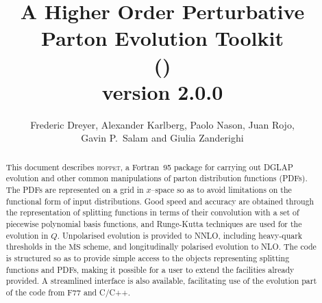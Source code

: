 \documentclass[12pt]{article}
\title{A Higher Order Perturbative Parton Evolution Toolkit \\
(\hoppet)\\

version 2.0.0
}
\author{%
  Frederic Dreyer,
  Alexander Karlberg,
  Paolo Nason,
  Juan Rojo,\\
  Gavin P.\ Salam and
  Giulia Zanderighi
}
\date{}
\newcommand{\MSbar}{\overline{\mathrm{MS}}}
\newcommand{\hoppet}{\textsc{hoppet}\xspace}
\begin{document}
\maketitle 

\begin{abstract}
  This document describes \hoppet, a Fortran~95 package for carrying out DGLAP
  evolution and other common manipulations of parton distribution
  functions (PDFs). The PDFs are represented on a grid in $x$--space so
  as to avoid limitations on the functional form of input
  distributions.  Good speed and accuracy are obtained through the
  representation of splitting functions in terms of their convolution
  with a set of piecewise polynomial basis functions, and Runge-Kutta
  techniques are used for the evolution in $Q$.  Unpolarised evolution
  is provided to NNLO, including heavy-quark thresholds in the
  $\MSbar$ scheme, and longitudinally polarised evolution to NLO. The
  code is structured so as to provide simple access to the objects
  representing splitting functions and PDFs, making it possible for a
  user to extend the facilities already provided.
%
  A streamlined interface is also available, facilitating use of the
  evolution part of the code from F77 and C/C++.  \smallskip
\end{abstract}

\end{document}
